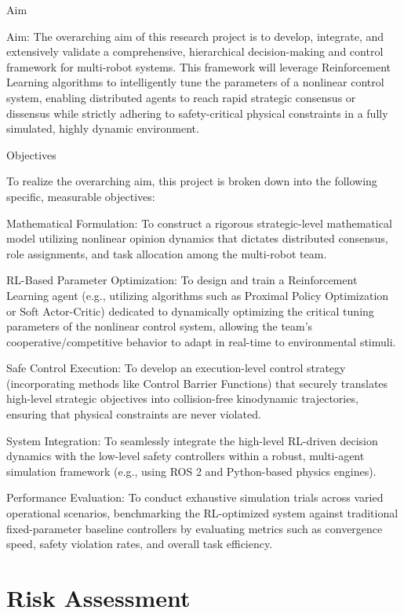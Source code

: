 \begin{uomappendix}
Aim

Aim: The overarching aim of this research project is to develop, integrate, and extensively validate a comprehensive, hierarchical decision-making and control framework for multi-robot systems. This framework will leverage Reinforcement Learning algorithms to intelligently tune the parameters of a nonlinear control system, enabling distributed agents to reach rapid strategic consensus or dissensus while strictly adhering to safety-critical physical constraints in a fully simulated, highly dynamic environment.

Objectives

To realize the overarching aim, this project is broken down into the following specific, measurable objectives:

Mathematical Formulation: To construct a rigorous strategic-level mathematical model utilizing nonlinear opinion dynamics that dictates distributed consensus, role assignments, and task allocation among the multi-robot team.

RL-Based Parameter Optimization: To design and train a Reinforcement Learning agent (e.g., utilizing algorithms such as Proximal Policy Optimization or Soft Actor-Critic) dedicated to dynamically optimizing the critical tuning parameters of the nonlinear control system, allowing the team's cooperative/competitive behavior to adapt in real-time to environmental stimuli.

Safe Control Execution: To develop an execution-level control strategy (incorporating methods like Control Barrier Functions) that securely translates high-level strategic objectives into collision-free kinodynamic trajectories, ensuring that physical constraints are never violated.

System Integration: To seamlessly integrate the high-level RL-driven decision dynamics with the low-level safety controllers within a robust, multi-agent simulation framework (e.g., using ROS 2 and Python-based physics engines).

Performance Evaluation: To conduct exhaustive simulation trials across varied operational scenarios, benchmarking the RL-optimized system against traditional fixed-parameter baseline controllers by evaluating metrics such as convergence speed, safety violation rates, and overall task efficiency.

\section{Risk Assessment}


\end{uomappendix}
